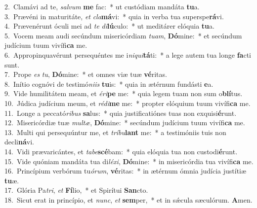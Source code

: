 {2.~}Clamávi ad te, \textit{sal}\textit{vum} \textbf{me} fac:~* ut custódiam mandáta \textbf{tu}a.\\
{3.~}Prævéni in maturitáte, \textit{et} \textit{cla}\textbf{má}vi:~* quia in verba tua superspe\textbf{rá}vi.\\
{4.~}Prævenérunt óculi mei ad \textit{te} \textit{di}\textbf{lú}culo:~* ut meditárer elóquia \textbf{tu}a.\\
{5.~}Vocem meam audi secúndum misericórdiam \textit{tu}\textit{am}, \textbf{Dó}mine:~* et secúndum judícium tuum vivífi\textbf{ca} me.\\
{6.~}Appropinquavérunt persequéntes me i\textit{ni}\textit{qui}\textbf{tá}ti:~* a lege autem tua longe \textbf{fa}cti sunt.\\
{7.~}Prope \textit{es} \textit{tu}, \textbf{Dó}mine:~* et omnes viæ tuæ \textbf{vé}ritas.\\
{8.~}Inítio cognóvi de testimó\textit{ni}\textit{is} \textbf{tu}is:~* quia in ætérnum fundásti \textbf{e}a.\\
{9.~}Vide humilitátem meam, et \textit{é}\textit{ri}\textbf{pe} me:~* quia legem tuam non sum o\textbf{blí}tus.\\
{10.~}Júdica judícium meum, et \textit{ré}\textit{di}\textbf{me} me:~* propter elóquium tuum vivífi\textbf{ca} me.\\
{11.~}Longe a peccató\textit{ri}\textit{bus} \textbf{sa}lus:~* quia justificatiónes tuas non exquisi\textbf{é}runt.\\
{12.~}Misericórdiæ tuæ \textit{mul}\textit{tæ}, \textbf{Dó}mine:~* secúndum judícium tuum vivífi\textbf{ca} me.\\
{13.~}Multi qui persequúntur me, et \textit{trí}\textit{bu}\textbf{lant} me:~* a testimóniis tuis non decli\textbf{ná}vi.\\
{14.~}Vidi prævaricántes, et \textit{ta}\textit{be}\textbf{scé}bam:~* quia elóquia tua non custodi\textbf{é}runt.\\
{15.~}Vide quóniam mandáta tua di\textit{lé}\textit{xi}, \textbf{Dó}mine:~* in misericórdia tua vivífi\textbf{ca} me.\\
{16.~}Princípium verbórum tu\textit{ó}\textit{rum}, \textbf{vé}ritas:~* in ætérnum ómnia judícia justítiæ \textbf{tu}æ.\\
{17.~}Glória Pa\textit{tri}, \textit{et} \textbf{Fí}lio,~* et Spirítui \textbf{San}cto.\\
{18.~}Sicut erat in princípio, et \textit{nunc}, \textit{et} \textbf{sem}per,~* et in sǽcula sæculórum. \textbf{A}men.\\
